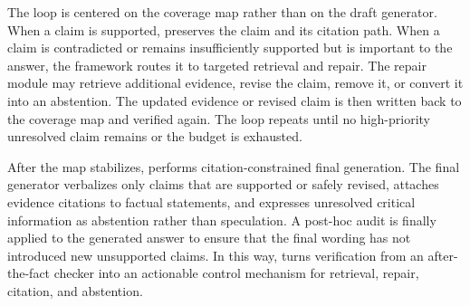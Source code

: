 The loop is centered on the coverage map rather than on the draft generator. When a claim is supported, \ragname preserves the claim and its citation path. When a claim is contradicted or remains insufficiently supported but is important to the answer, the framework routes it to targeted retrieval and repair. The repair module may retrieve additional evidence, revise the claim, remove it, or convert it into an abstention. The updated evidence or revised claim is then written back to the coverage map and verified again. The loop repeats until no high-priority unresolved claim remains or the budget is exhausted.

After the map stabilizes, \ragname performs citation-constrained final generation. The final generator verbalizes only claims that are supported or safely revised, attaches evidence citations to factual statements, and expresses unresolved critical information as abstention rather than speculation. A post-hoc audit is finally applied to the generated answer to ensure that the final wording has not introduced new unsupported claims. In this way, \ragname turns verification from an after-the-fact checker into an actionable control mechanism for retrieval, repair, citation, and abstention.

